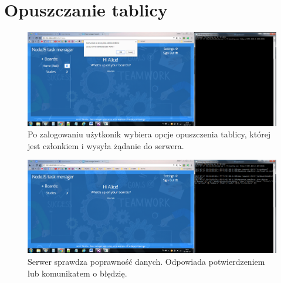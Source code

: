 \documentclass[12pt]{report}
\begin{document}
\section{Opuszczanie tablicy}
\begin{figure}[!hb]
\centering
\includegraphics[width=\textwidth,height=\textheight,keepaspectratio]{D1.png}
\captionsetup{labelformat=empty}
\caption[]{Po zalogowaniu użytkonik wybiera opcje opuszczenia tablicy, której jest członkiem i wysyła żądanie do serwera.}
\end{figure}
\begin{figure}[!hb]
\centering
\includegraphics[width=\textwidth,height=\textheight,keepaspectratio]{D2.png}
\captionsetup{labelformat=empty}
\caption[]{Serwer sprawdza poprawność danych. Odpowiada potwierdzeniem lub komunikatem o błędzię.}
\end{figure}
\end{document}
